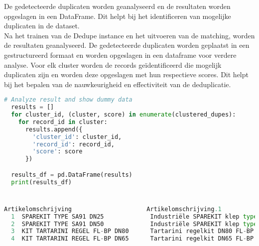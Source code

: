 De gedetecteerde duplicaten worden geanalyseerd en de resultaten worden opgeslagen in een DataFrame. Dit helpt bij het identificeren van mogelijke duplicaten in de dataset. 
\\Na het trainen van de Dedupe instance en het uitvoeren van de matching, worden de resultaten geanalyseerd. De gedetecteerde duplicaten worden geplaatst in een gestructureerd formaat en worden opgeslagen in een dataframe voor verdere analyse. Voor elk cluster worden de records geïdentificeerd  die mogelijk duplicaten zijn en worden deze opgeslagen met hun respectieve scores. Dit helpt bij het bepalen van de nauwkeurigheid en effectiviteit van de deduplicatie.
\begin{lstlisting}[language=Python, caption={Identificeren van mogelijke duplicaten in de dataset}]
  # Analyze result and show dummy data
  results = []
  for cluster_id, (cluster, score) in enumerate(clustered_dupes):
    for record_id in cluster:
      results.append({
        'cluster_id': cluster_id,
        'record_id': record_id,
        'score': score
      })

  results_df = pd.DataFrame(results)
  print(results_df)
\end{lstlisting}

\section{}%
\label{sec:analyseResultatenPOC}

\begin{lstlisting}[language=Python, caption={Output dedupe dataframe}]
     Artikelomschrijving		             Artikelomschrijving.1 	                      Voorts.gem.prijs	cluster_id	record_id		score
  1  SPAREKIT TYPE SA91 DN25             Industriële SPAREKIT klep type SA91	DN25    24,99	            1	          255	         0.50913
  2  SPAREKIT TYPE SA91 DN50             Industriële SPAREKIT klep type SA91 DN50	    30,00	            1	          255	         0.50913
  3  KIT TARTARINI REGEL FL-BP DN80      Tartarini regelkit DN80 FL-BP                589,00	          2	          726	         0.34925
  4  KIT TARTARINI REGEL FL-BP DN65      Tartarini regelkit DN65 FL-BP                599,00	          2	          726	         0.34259
\end{lstlisting}

